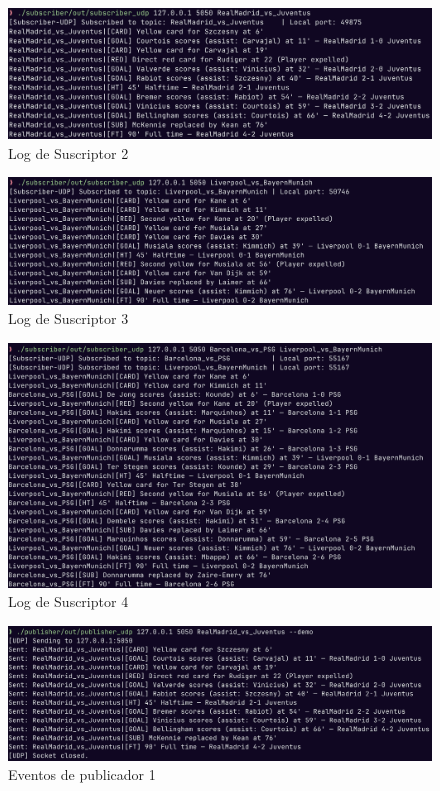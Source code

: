 \documentclass[10pt]{article}
\begin{document}
\begin{figure}[H]
    \centering
    \includegraphics[width=.85\textwidth]{screenshots/udp-screenshots/sub2.png}
    \caption{Log de Suscriptor 2}
\end{figure} 

\begin{figure}[H]
    \centering
    \includegraphics[width=.85\textwidth]{screenshots/udp-screenshots/sub3.png}
    \caption{Log de Suscriptor 3}
\end{figure} 

\begin{figure}[H]
    \centering
    \includegraphics[width=.85\textwidth]{screenshots/udp-screenshots/sub4.png}
    \caption{Log de Suscriptor 4}
\end{figure} 

\begin{figure}[H]
    \centering
    \includegraphics[width=.85\textwidth]{screenshots/udp-screenshots/pub1.png}
    \caption{Eventos de publicador 1}
\end{figure} 
\end{document}

